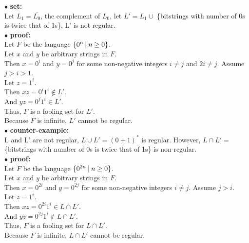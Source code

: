 \documentclass[12pt,a4paper]{article}
\begin{document}
\noindent
$\bullet$ \textbf{set:}\\
Let $L_1=\overline{L_0}$, the complement of $L_0$, let $L'=L_1 \cup$ \{bitstrings with number of 0s is twice that of 1s\}, L' is not regular.\\
$\bullet$ \textbf{proof:}\\
Let $F$ be the language $\{0^n\ \vline\ n \ge 0\}$. \\
Let $x$ and $y$ be arbitrary strings in $F$. \\
Then $x=0^{i}$ and $y=0^{j}$ for some non-negative integers $i\neq j$ and $2i\neq j$. Assume $j > i >1$. \\
Let $z=1^{i}$. \\
Then $xz=0^{i}1^{i} \notin L'$. \\ 
And $yz = 0^{j}1^{i}\in L'$. \\
Thus, $F$ is a fooling set for $L'$. \\
Because $F$ is infinite, $L'$ cannot be regular. \\

\noindent
$\bullet$ \textbf{counter-example:}\\
L and L' are not regular, $L \cup L' = (0+1)^* $ is regular.
However, $L \cap L' =$ \{bitstrings with number of 0s is twice that of 1s\} is non-regular.\\
$\bullet$ \textbf{proof:}\\
Let $F$ be the language $\{0^{2n}\ \vline\ n \ge 0\}$. \\
Let $x$ and $y$ be arbitrary strings in $F$. \\
Then $x=0^{2i}$ and $y=0^{2j}$ for some non-negative integers $i\neq j$. Assume $j > i$. \\
Let $z=1^{i}$. \\
Then $xz=0^{2i}1^{i} \in L \cap L'$. \\ 
And $yz = 0^{2j}1^{i}\notin L \cap L'$. \\
Thus, $F$ is a fooling set for $L \cap L'$. \\
Because $F$ is infinite, $L \cap L'$ cannot be regular. \\
\end{document}
